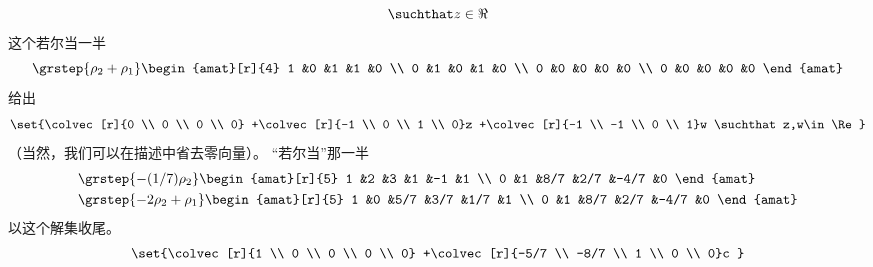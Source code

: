 \begin{exercises}
\begin{answer}
\begin{exparts}
\begin{equation*}
{              \suchthat z\in\Re}
        \end{equation*}
      \partsitem 这个若尔当一半
        \begin{equation*}
          \grstep{\rho_2+\rho_1}
          \begin{amat}[r]{4}
            1  &0  &1   &1  &0 \\
            0  &1  &0   &1  &0 \\
            0  &0  &0   &0  &0 \\
            0  &0  &0   &0  &0
          \end{amat}
        \end{equation*}
        给出
        \begin{equation*}
          \set{\colvec[r]{0 \\ 0 \\ 0 \\ 0}
               +\colvec[r]{-1 \\ 0 \\ 1 \\ 0}z
               +\colvec[r]{-1 \\ -1 \\ 0 \\ 1}w
              \suchthat z,w\in\Re}
        \end{equation*}
        （当然，我们可以在描述中省去零向量）。
      \partsitem “若尔当”那一半
        \begin{align*}
          &\grstep{-(1/7)\rho_2}
          \begin{amat}[r]{5}
            1  &2  &3   &1   &-1   &1  \\
            0  &1  &8/7 &2/7 &-4/7 &0
          \end{amat}                   \\
          &\grstep{-2\rho_2+\rho_1}
          \begin{amat}[r]{5}
            1  &0  &5/7 &3/7 &1/7  &1  \\
            0  &1  &8/7 &2/7 &-4/7 &0
          \end{amat}
        \end{align*}
        以这个解集收尾。
        \begin{equation*}
          \set{\colvec[r]{1 \\ 0 \\ 0 \\ 0 \\ 0}
               +\colvec[r]{-5/7 \\ -8/7 \\ 1 \\ 0 \\ 0}c
}
\end{equation*}
\end{exparts}
\end{answer}
\end{exercises}
